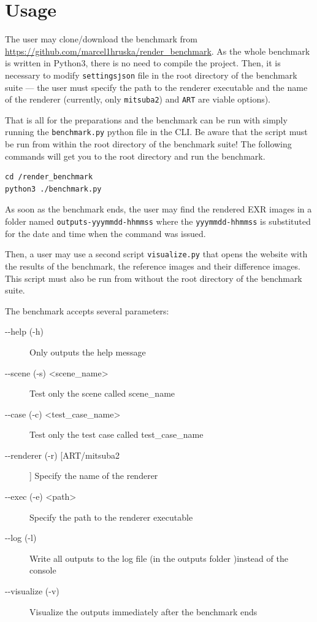 \section{Usage}

The user may clone/download the benchmark from \url{https://github.com/marcel1hruska/render_benchmark}. As the whole benchmark is written in Python3, there is no need to compile the project. Then, it is necessary to modify \texttt{settings\.json} file in the root directory of the benchmark suite --- the user must specify the path to the renderer executable and the name of the renderer (currently, only \texttt{mitsuba2}) and \texttt{ART} are viable options).

That is all for the preparations and the benchmark can be run with simply running the \texttt{benchmark.py} python file in the CLI. Be aware that the script must be run from within the root directory of the benchmark suite! The following commands will get you to the root directory and run the benchmark.

\begin{lstlisting}
cd /render_benchmark
python3 ./benchmark.py
\end{lstlisting}

As soon as the benchmark ends, the user may find the rendered EXR images in a folder named \texttt{outputs-yyymmdd-hhmmss} where the \texttt{yyymmdd-hhmmss} is substituted for the date and time when the command was issued.

Then, a user may use a second script \texttt{visualize.py} that opens the website with the results of the benchmark, the reference images and their difference images. This script must also be run from without the root directory of the benchmark suite.

The benchmark accepts several parameters:
\begin{description}
	\item[-{}-help (-h)] Only outputs the help message
	\item[-{}-scene (-s) \textless scene\_name\textgreater] Test only the scene called scene\_name
	\item[-{}-case (-c) \textless test\_case\_name\textgreater] Test only the test case called test\_case\_name
	\item[-{}-renderer (-r) [ART/mitsuba2]] Specify the name of the renderer 
	\item[-{}-exec (-e) \textless path\textgreater] Specify the path to the renderer executable
	\item[-{}-log (-l)] Write all outputs to the log file (in the outputs folder )instead of the console
	\item[-{}-visualize (-v)] Visualize the outputs immediately after the benchmark ends
\end{description}

